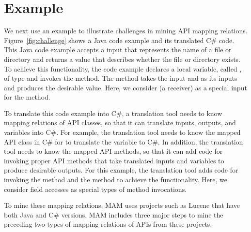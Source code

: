 \section{Example}
\label{sec:example}

We next use an example to illustrate challenges in mining
API mapping relations. Figure~\ref{fig:challenge} shows a
Java code example and its translated C\# code. This Java code
example accepts a  input that represents the name of a
file or directory and returns a  value that
describes whether the file or directory exists. To achieve this functionality, the
code example declares a local variable, called , of
type  and invokes the  method. The
method takes the  input and  as its
inputs and produces the desirable  value. Here, we
consider  (a receiver) as a special input for
the  method.

To translate this code example into C\#, a translation tool needs to
know mapping relations of API classes, so that it can translate inputs,
outputs, and variables into C\#. For example, the translation tool
needs to know the mapped API class in C\# for 
to translate the variable  to C\#. In addition, the
translation tool needs to know the mapped API methods, so that it can
add code for invoking proper API methods that take translated inputs and variables to
produce desirable outputs. For this example, the translation tool
adds code for invoking the  method and the
 method to achieve the functionality.
Here, we consider field accesses as special types of method invocations.

To mine these mapping relations, MAM uses projects such as Lucene
that have both Java and C\# versions. MAM includes three major steps
to mine the preceding two types of mapping relations of APIs from these projects.

